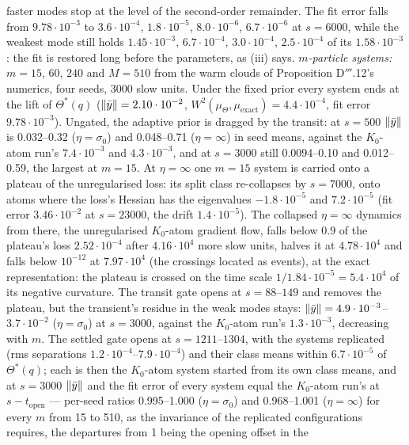faster modes stop at the level of the second-order remainder. The fit error falls from $9.78\cdot10^{-3}$ to
$3.6\cdot10^{-4}$, $1.8\cdot10^{-5}$, $8.0\cdot10^{-6}$, $6.7\cdot10^{-6}$ at $s = 6000$, while the weakest mode still
holds $1.45\cdot10^{-3}$, $6.7\cdot10^{-4}$, $3.0\cdot10^{-4}$, $2.5\cdot10^{-4}$ of its $1.58\cdot10^{-3}$: the fit is
restored long before the parameters, as (iii) says. \emph{$m$-particle systems:} $m = 15$, $60$, $240$ and $M = 510$
from the warm clouds of Proposition D$'''$.12's numerics, four seeds, 3000 slow units. Under the fixed prior every
system ends at the lift of $\Theta^*(q)$ ($\lVert \bar y\rVert = 2.10\cdot10^{-2}$,
$W^2(\mu_\Theta,\mu_{\mathrm{exact}}) = 4.4\cdot10^{-4}$, fit error $9.78\cdot10^{-3}$). Ungated, the adaptive prior is
dragged by the transit: at $s = 500$ $\lVert \bar y\rVert$ is 0.032--0.32 ($\eta = \sigma_0$) and 0.048--0.71
($\eta = \infty$) in seed means, against the $K_0$-atom run's $7.4\cdot10^{-3}$ and $4.3\cdot10^{-3}$, and at
$s = 3000$ still 0.0094--0.10 and 0.012--0.59, the largest at $m = 15$. At $\eta = \infty$ one $m = 15$ system is
carried onto a plateau of the unregularised loss: its split class re-collapses by $s = 7000$, onto atoms where the
loss's Hessian has the eigenvalues $-1.8\cdot10^{-5}$ and $7.2\cdot10^{-5}$ (fit error $3.46\cdot10^{-2}$ at
$s = 23000$, the drift $1.4\cdot10^{-5}$). The collapsed $\eta = \infty$ dynamics from there, the unregularised
$K_0$-atom gradient flow, falls below 0.9 of the plateau's loss $2.52\cdot10^{-4}$ after $4.16\cdot10^4$ more slow
units, halves it at $4.78\cdot10^4$ and falls below $10^{-12}$ at $7.97\cdot10^4$ (the crossings located as events),
at the exact representation: the plateau is crossed on the time scale $1/1.84\cdot10^{-5} = 5.4\cdot10^4$ of its
negative curvature. The transit gate opens at $s = 88$--$149$ and removes the plateau, but the transient's residue in
the weak modes stays: $\lVert \bar y\rVert = 4.9\cdot10^{-3}$--$3.7\cdot10^{-2}$ ($\eta = \sigma_0$) at $s = 3000$, against
the $K_0$-atom run's $1.3\cdot10^{-3}$, decreasing with $m$. The settled gate opens at $s = 1211$--$1304$, with the
systems replicated (rms separations $1.2\cdot10^{-4}$--$7.9\cdot10^{-4}$) and their class means within
$6.7\cdot10^{-5}$ of $\Theta^*(q)$; each is then the $K_0$-atom system started from its own class means, and at
$s = 3000$ $\lVert \bar y\rVert$ and the fit error of every system equal the $K_0$-atom run's at $s - t_{\mathrm{open}}$ ---
per-seed ratios 0.995--1.000 ($\eta = \sigma_0$) and 0.968--1.001 ($\eta = \infty$) for every $m$ from 15 to 510, as
the invariance of the replicated configurations requires, the departures from 1 being the opening offset in the
